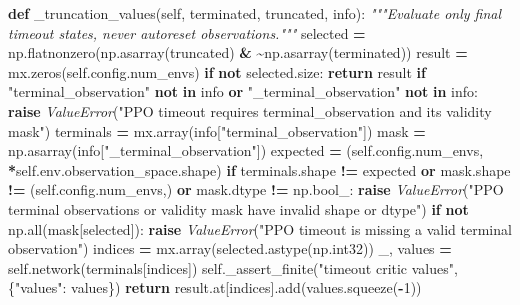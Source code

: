 \documentclass[
  chinese,
  11pt,
  letterpaper,
]{article}
\newenvironment{Shaded}{\begin{snugshade}}{\end{snugshade}}
\newcommand{\BuiltInTok}[1]{#1}
\newcommand{\CommentTok}[1]{\textcolor[rgb]{0.56,0.35,0.01}{\textit{#1}}}
\newcommand{\ControlFlowTok}[1]{\textcolor[rgb]{0.13,0.29,0.53}{\textbf{#1}}}
\newcommand{\DecValTok}[1]{\textcolor[rgb]{0.00,0.00,0.81}{#1}}
\newcommand{\KeywordTok}[1]{\textcolor[rgb]{0.13,0.29,0.53}{\textbf{#1}}}
\newcommand{\NormalTok}[1]{#1}
\newcommand{\OperatorTok}[1]{\textcolor[rgb]{0.81,0.36,0.00}{\textbf{#1}}}
\newcommand{\PreprocessorTok}[1]{\textcolor[rgb]{0.56,0.35,0.01}{\textit{#1}}}
\newcommand{\StringTok}[1]{\textcolor[rgb]{0.31,0.60,0.02}{#1}}
\newcommand{\VariableTok}[1]{\textcolor[rgb]{0.00,0.00,0.00}{#1}}
\renewenvironment{Shaded}{\par\smallskip}{\par\smallskip}
\begin{document}
\begin{Shaded}
\begin{Highlighting}[]
    \KeywordTok{def}\NormalTok{ \_truncation\_values(}\VariableTok{self}\NormalTok{, terminated, truncated, info):}
        \CommentTok{"""Evaluate only final timeout states, never autoreset observations."""}
\NormalTok{        selected }\OperatorTok{=}\NormalTok{ np.flatnonzero(np.asarray(truncated) }\OperatorTok{\&} \OperatorTok{\textasciitilde{}}\NormalTok{np.asarray(terminated))}
\NormalTok{        result }\OperatorTok{=}\NormalTok{ mx.zeros(}\VariableTok{self}\NormalTok{.config.num\_envs)}
        \ControlFlowTok{if} \KeywordTok{not}\NormalTok{ selected.size:}
            \ControlFlowTok{return}\NormalTok{ result}
        \ControlFlowTok{if} \StringTok{"terminal\_observation"} \KeywordTok{not} \KeywordTok{in}\NormalTok{ info }\KeywordTok{or} \StringTok{"\_terminal\_observation"} \KeywordTok{not} \KeywordTok{in}\NormalTok{ info:}
            \ControlFlowTok{raise} \PreprocessorTok{ValueError}\NormalTok{(}\StringTok{"PPO timeout requires terminal\_observation and its validity mask"}\NormalTok{)}
\NormalTok{        terminals }\OperatorTok{=}\NormalTok{ mx.array(info[}\StringTok{"terminal\_observation"}\NormalTok{])}
\NormalTok{        mask }\OperatorTok{=}\NormalTok{ np.asarray(info[}\StringTok{"\_terminal\_observation"}\NormalTok{])}
\NormalTok{        expected }\OperatorTok{=}\NormalTok{ (}\VariableTok{self}\NormalTok{.config.num\_envs, }\OperatorTok{*}\VariableTok{self}\NormalTok{.env.observation\_space.shape)}
        \ControlFlowTok{if}\NormalTok{ terminals.shape }\OperatorTok{!=}\NormalTok{ expected }\KeywordTok{or}\NormalTok{ mask.shape }\OperatorTok{!=}\NormalTok{ (}\VariableTok{self}\NormalTok{.config.num\_envs,) }\KeywordTok{or}\NormalTok{ mask.dtype }\OperatorTok{!=}\NormalTok{ np.bool\_:}
            \ControlFlowTok{raise} \PreprocessorTok{ValueError}\NormalTok{(}\StringTok{"PPO terminal observations or validity mask have invalid shape or dtype"}\NormalTok{)}
        \ControlFlowTok{if} \KeywordTok{not}\NormalTok{ np.}\BuiltInTok{all}\NormalTok{(mask[selected]):}
            \ControlFlowTok{raise} \PreprocessorTok{ValueError}\NormalTok{(}\StringTok{"PPO timeout is missing a valid terminal observation"}\NormalTok{)}
\NormalTok{        indices }\OperatorTok{=}\NormalTok{ mx.array(selected.astype(np.int32))}
\NormalTok{        \_, values }\OperatorTok{=} \VariableTok{self}\NormalTok{.network(terminals[indices])}
        \VariableTok{self}\NormalTok{.\_assert\_finite(}\StringTok{"timeout critic values"}\NormalTok{, \{}\StringTok{"values"}\NormalTok{: values\})}
        \ControlFlowTok{return}\NormalTok{ result.at[indices].add(values.squeeze(}\OperatorTok{{-}}\DecValTok{1}\NormalTok{))}


\end{Highlighting}
\end{Shaded}
\end{document}
